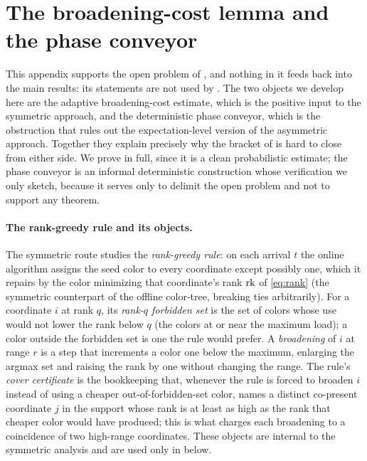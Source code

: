 \section{The broadening-cost lemma and the phase conveyor}\label{app:bc}

This appendix supports the open problem of , and nothing in it feeds back into the main results: its
statements are not used by . The two objects we develop here are the adaptive
broadening-cost estimate, which is the positive input to the symmetric approach, and the deterministic phase conveyor, which
is the obstruction that rules out the expectation-level version of the asymmetric approach. Together they explain precisely
why the bracket of  is hard to close from either side. We prove  in full, since it is a clean
probabilistic estimate; the phase conveyor is an informal deterministic construction whose verification we only sketch,
because it serves only to delimit the open problem and not to support any theorem.

\paragraph{The rank-greedy rule and its objects.}
The symmetric route studies the \emph{rank-greedy rule}: on each arrival $t$ the online algorithm assigns the seed color to
every coordinate except possibly one, which it repairs by the color minimizing that coordinate's rank $\mathrm{rk}$ of
\eqref{eq:rank} (the symmetric counterpart of the offline color-tree, breaking ties arbitrarily). For a coordinate $i$ at
rank $q$, its \emph{rank-$q$ forbidden set} is the set of colors whose use would not lower the rank below $q$ (the colors at
or near the maximum load); a color outside the forbidden set is one the rule would prefer. A \emph{broadening} of $i$ at
range $r$ is a step that increments a color one below the maximum, enlarging the argmax set and raising the rank by one
without changing the range. The rule's \emph{cover certificate} is the bookkeeping that, whenever the rule is forced to
broaden $i$ instead of using a cheaper out-of-forbidden-set color, names a distinct co-present coordinate $j$ in the support
whose rank is at least as high as the rank that cheaper color would have produced; this is what charges each broadening to a
coincidence of two high-range coordinates. These objects are internal to the symmetric analysis and are used only in
 below.

